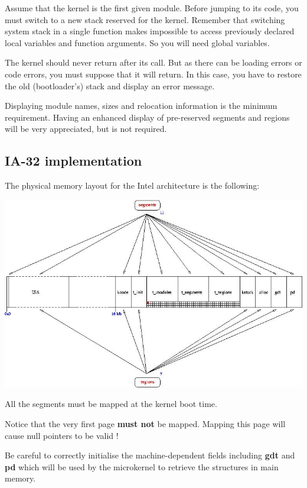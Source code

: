 Assume that  the kernel is the  first given module.  Before jumping to
its  code,  you   must  switch  to  a  new   stack  reserved  for  the
kernel.  Remember that  switching system  stack in  a  single function
makes  impossible to  access previously  declared local  variables and
function arguments. So you will need global variables.

The kernel  should never return  after its call.  But as there  can be
loading  errors  or  code  errors,  you  must  suppose  that  it  will
return. In this case, you have to restore the old (bootloader's) stack
and display an error message.

Displaying  module  names, sizes  and  relocation  information is  the
minimum  requirement.   Having  an  enhanced display  of  pre-reserved
segments and regions will be very appreciated, but is not required.

%
%

\subsection{IA-32 implementation}

The physical memory layout for the Intel architecture is the following:

\centerline{\includegraphics[scale=0.5]{figures/k1-memory-layout.jpg}}

All the segments must be mapped at the kernel boot time.

Notice that the  very first page \textbf{must not}  be mapped. Mapping
this page will cause null pointers to be valid !

Be careful to correctly initialise the machine-dependent fields
including \textbf{gdt} and \textbf{pd} which will be used by the microkernel
to retrieve the structures in main memory.

